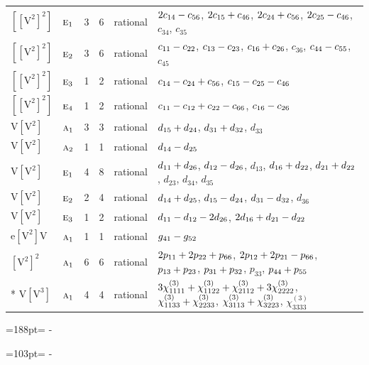 \documentclass[10pt,a4paper]{article}
\newcommand{\needspace}[1]{\par\penalty-100\begingroup\dimen0=#1\relax\dimen2=\pagegoal
  \advance\dimen2-\pagetotal\ifdim\dimen0>\dimen2\relax\ifdim\dimen2>0pt\vfil\break\fi\fi
  \endgroup}
\numberwithin{equation}{section}
\newcommand{\irr}[1]{\text{\normalfont\scshape #1}}
\newcommand{\jahn}[1]{\mathrm{#1}}
\newlength{\fillwidth}\newlength{\cellwidth}\newlength{\colwidth}
\newcommand{\signbreak}{\penalty100\relax}
\begin{document}
{\begin{longtable}{@{}llrrl>{\RaggedRight\arraybackslash}p{\fillwidth}@{}}
$\jahn{[[V^{2}]^{2}]}$ & $\irr{e}_{1}$ & 3 & 6 & rational & $2c_{14} -\signbreak c_{56}$, $2c_{15} +\signbreak c_{46}$, $2c_{24} +\signbreak c_{56}$, $2c_{25} -\signbreak c_{46}$, $c_{34}$, $c_{35}$\\
$\jahn{[[V^{2}]^{2}]}$ & $\irr{e}_{2}$ & 3 & 6 & rational & $c_{11} -\signbreak c_{22}$, $c_{13} -\signbreak c_{23}$, $c_{16} +\signbreak c_{26}$, $c_{36}$, $c_{44} -\signbreak c_{55}$, $c_{45}$\\
$\jahn{[[V^{2}]^{2}]}$ & $\irr{e}_{3}$ & 1 & 2 & rational & $c_{14} -\signbreak c_{24} +\signbreak c_{56}$, $c_{15} -\signbreak c_{25} -\signbreak c_{46}$\\
$\jahn{[[V^{2}]^{2}]}$ & $\irr{e}_{4}$ & 1 & 2 & rational & $c_{11} -\signbreak c_{12} +\signbreak c_{22} -\signbreak c_{66}$, $c_{16} -\signbreak c_{26}$\\
$\jahn{V[V^{2}]}$ & $\irr{a}_{1}$ & 3 & 3 & rational & $d_{15} +\signbreak d_{24}$, $d_{31} +\signbreak d_{32}$, $d_{33}$\\
$\jahn{V[V^{2}]}$ & $\irr{a}_{2}$ & 1 & 1 & rational & $d_{14} -\signbreak d_{25}$\\
$\jahn{V[V^{2}]}$ & $\irr{e}_{1}$ & 4 & 8 & rational & $d_{11} +\signbreak d_{26}$, $d_{12} -\signbreak d_{26}$, $d_{13}$, $d_{16} +\signbreak d_{22}$, $d_{21} +\signbreak d_{22}$, $d_{23}$, $d_{34}$, $d_{35}$\\
$\jahn{V[V^{2}]}$ & $\irr{e}_{2}$ & 2 & 4 & rational & $d_{14} +\signbreak d_{25}$, $d_{15} -\signbreak d_{24}$, $d_{31} -\signbreak d_{32}$, $d_{36}$\\
$\jahn{V[V^{2}]}$ & $\irr{e}_{3}$ & 1 & 2 & rational & $d_{11} -\signbreak d_{12} -\signbreak 2d_{26}$, $2d_{16} +\signbreak d_{21} -\signbreak d_{22}$\\
$\jahn{e[V^{2}]V}$ & $\irr{a}_{1}$ & 1 & 1 & rational & $\mathnormal{g}_{41} -\signbreak \mathnormal{g}_{52}$\\
$\jahn{[V^{2}]^{2}}$ & $\irr{a}_{1}$ & 6 & 6 & rational & $2p_{11} +\signbreak 2p_{22} +\signbreak p_{66}$, $2p_{12} +\signbreak 2p_{21} -\signbreak p_{66}$, $p_{13} +\signbreak p_{23}$, $p_{31} +\signbreak p_{32}$, $p_{33}$, $p_{44} +\signbreak p_{55}$\\*
$\jahn{V[V^{3}]}$ & $\irr{a}_{1}$ & 4 & 4 & rational & $3\chi^{(3)}_{1111} +\signbreak \chi^{(3)}_{1122} +\signbreak \chi^{(3)}_{2112} +\signbreak 3\chi^{(3)}_{2222}$, $\chi^{(3)}_{1133} +\signbreak \chi^{(3)}_{2233}$, $\chi^{(3)}_{3113} +\signbreak \chi^{(3)}_{3223}$, $\chi^{(3)}_{3333}$\\
\bottomrule\end{longtable}}
\needspace{188pt}
\needspace{103pt}
\end{document}
